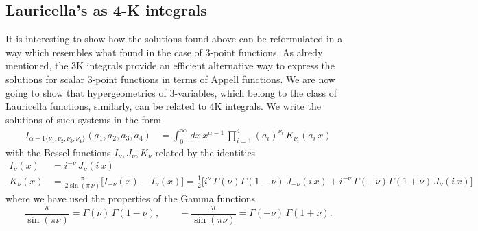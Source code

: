 \documentclass[a4paper,11pt,openright,twoside]{book}
\let\a=\alpha   \let\b=\beta   \let\g=\gamma   \let\d=\delta
\let\n=\nu      \let\x=\xi     \let\p=\pi      \let\r=\rho
\numberwithin{equation}{section}
\begin{document}
{{	\subsection{Lauricella's as 4-K integrals}
	It is interesting to show how the solutions found above can be reformulated in a way which resembles what found in the case of 3-point functions. As alredy mentioned, the 3K integrals provide an efficient alternative way to express the solutions for scalar 3-point functions in terms of Appell functions. We are now going to show that  hypergeometrics of 3-variables, which belong to the class of Lauricella functions, similarly, can be related to 4K integrals. 
	We write the solutions of such systems in the form
	\begin{align}
		I_{\a-1\{\n_1,\n_2,\n_3,\n_4\}}(a_1,a_2,a_3,a_4)&=\int_0^\infty\,dx\,x^{\a-1}\,\prod_{i=1}^4(a_i)^{\n_i}\,K_{\n_i}(a_i\,x)
		\label{4Kintegral}
	\end{align} 
	with the Bessel functions $I_\nu,J_\nu, K_\nu$ related by the identities
	\begin{align}
		I_\nu(x)&=i^{-\n}\,J_{\n}(i\,x)\\
		K_\nu(x)&=\frac{\pi}{2\sin(\pi\,\n)}\bigg[I_{-\n}(x)-I_\n(x)\bigg]=\frac{1}{2}\bigg[i^\nu\, \Gamma(\n)\Gamma(1-\n)\,J_{-\n}(i\,x)+i^{-\n}\,\Gamma(-\n)\Gamma(1+\n)\,J_\n(i\,x)\bigg]\label{Kscomp}
	\end{align}
	where we have used the properties of the Gamma functions
	\begin{equation}
		\frac{\pi}{\sin(\pi\n)}=\Gamma(\n)\,\Gamma(1-\n),\qquad-\frac{\pi}{\sin(\pi\n)}=\Gamma(-\n)\,\Gamma(1+\n).
	\end{equation}
	
}}
\end{document}
